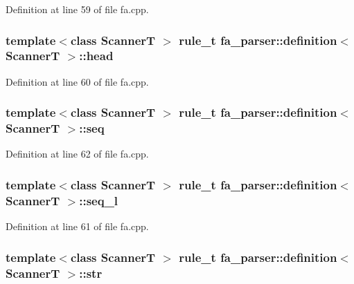Definition at line 59 of file fa.\+cpp.

\hypertarget{structfa__parser_1_1definition_a9ac398c08482622c6231ca45ae3637c7}{
\subsubsection[{head}]{\setlength{\rightskip}{0pt plus 5cm}template$<$class Scanner\+T $>$ {\bf rule\+\_\+t} {\bf fa\+\_\+parser\+::definition}$<$ Scanner\+T $>$\+::head}}\label{structfa__parser_1_1definition_a9ac398c08482622c6231ca45ae3637c7}


Definition at line 60 of file fa.\+cpp.

\hypertarget{structfa__parser_1_1definition_af773d1e41b99324de86ac074ef275379}{
\subsubsection[{seq}]{\setlength{\rightskip}{0pt plus 5cm}template$<$class Scanner\+T $>$ {\bf rule\+\_\+t} {\bf fa\+\_\+parser\+::definition}$<$ Scanner\+T $>$\+::seq}}\label{structfa__parser_1_1definition_af773d1e41b99324de86ac074ef275379}


Definition at line 62 of file fa.\+cpp.

\hypertarget{structfa__parser_1_1definition_acb61c19eed7df6831e569ba26e260f71}{
\subsubsection[{seq\+\_\+l}]{\setlength{\rightskip}{0pt plus 5cm}template$<$class Scanner\+T $>$ {\bf rule\+\_\+t} {\bf fa\+\_\+parser\+::definition}$<$ Scanner\+T $>$\+::seq\+\_\+l}}\label{structfa__parser_1_1definition_acb61c19eed7df6831e569ba26e260f71}


Definition at line 61 of file fa.\+cpp.

\hypertarget{structfa__parser_1_1definition_a9b16d6bb1530e878a04ccd364dc2302e}{
\subsubsection[{str}]{\setlength{\rightskip}{0pt plus 5cm}template$<$class Scanner\+T $>$ {\bf rule\+\_\+t} {\bf fa\+\_\+parser\+::definition}$<$ Scanner\+T $>$\+::str}}\label{structfa__parser_1_1definition_a9b16d6bb1530e878a04ccd364dc2302e}


